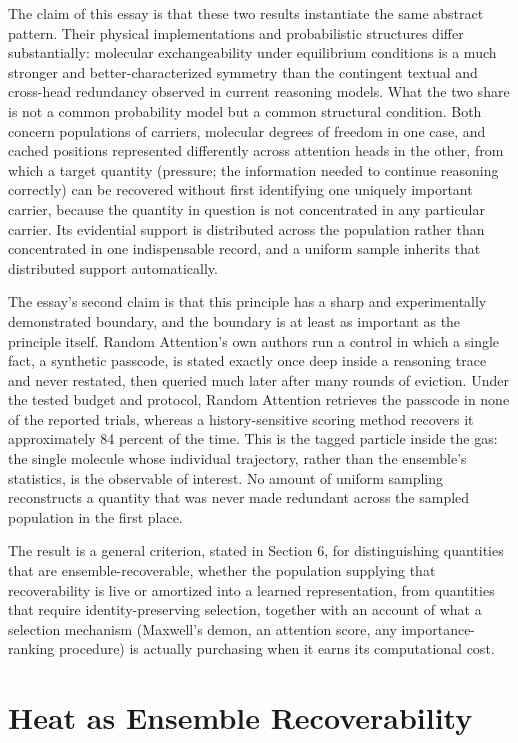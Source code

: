 \documentclass[11pt]{article}
\begin{document}
The claim of this essay is that these two results instantiate the same abstract pattern. Their physical implementations and probabilistic structures differ substantially: molecular exchangeability under equilibrium conditions is a much stronger and better-characterized symmetry than the contingent textual and cross-head redundancy observed in current reasoning models. What the two share is not a common probability model but a common structural condition. Both concern populations of carriers, molecular degrees of freedom in one case, and cached positions represented differently across attention heads in the other, from which a target quantity (pressure; the information needed to continue reasoning correctly) can be recovered without first identifying one uniquely important carrier, because the quantity in question is not concentrated in any particular carrier. Its evidential support is distributed across the population rather than concentrated in one indispensable record, and a uniform sample inherits that distributed support automatically.

The essay's second claim is that this principle has a sharp and experimentally demonstrated boundary, and the boundary is at least as important as the principle itself. Random Attention's own authors run a control in which a single fact, a synthetic passcode, is stated exactly once deep inside a reasoning trace and never restated, then queried much later after many rounds of eviction. Under the tested budget and protocol, Random Attention retrieves the passcode in none of the reported trials, whereas a history-sensitive scoring method recovers it approximately 84 percent of the time. This is the tagged particle inside the gas: the single molecule whose individual trajectory, rather than the ensemble's statistics, is the observable of interest. No amount of uniform sampling reconstructs a quantity that was never made redundant across the sampled population in the first place.

The result is a general criterion, stated in Section 6, for distinguishing quantities that are ensemble-recoverable, whether the population supplying that recoverability is live or amortized into a learned representation, from quantities that require identity-preserving selection, together with an account of what a selection mechanism (Maxwell's demon, an attention score, any importance-ranking procedure) is actually purchasing when it earns its computational cost.

\section{Heat as Ensemble Recoverability}
\end{document}

